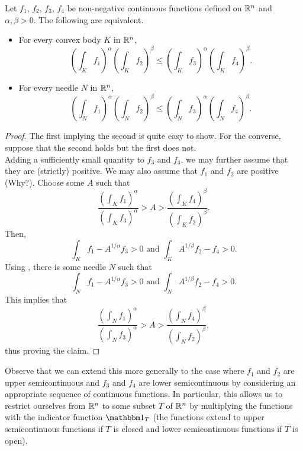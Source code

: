 		\begin{lemma}
			\label{lem: 5.1}
			Let $f_1$, $f_2$, $f_3$, $f_4$ be non-negative continuous functions defined on $\mathbb{R}^n$ and $\alpha,\beta>0$. The following are equivalent.
			\begin{itemize}
				\item For every convex body $K$ in $\mathbb{R}^n$,
					\[ \left(\int_K f_1\right)^\alpha \left(\int_K f_2\right)^\beta \leq \left(\int_K f_3\right)^\alpha \left(\int_K f_4\right)^\beta. \]
				\item For every needle $N$ in $\mathbb{R}^n$,
					\[ \left(\int_N f_1\right)^\alpha \left(\int_N f_2\right)^\beta \leq \left(\int_N f_3\right)^\alpha \left(\int_N f_4\right)^\beta. \]
			\end{itemize}
		\end{lemma}
		\begin{proof}
			The first implying the second is quite easy to show. For the converse, suppose that the second holds but the first does not.\\
			Adding a sufficiently small quantity to $f_3$ and $f_4$, we may further assume that they are (strictly) positive. We may also assume that $f_1$ and $f_2$ are positive (Why?). Choose some $A$ such that
			\[ \frac{\left(\int_K f_1\right)^\alpha}{\left(\int_K f_3\right)^\alpha} > A > \frac{\left(\int_K f_4\right)^\beta}{\left(\int_K f_2\right)^\beta}. \]
			Then,
			\[ \int_K f_1 - A^{1/\alpha}f_3 > 0 \text{ and } \int_K A^{1/\beta}f_2 - f_4 > 0. \]
			Using , there is some needle $N$ such that
			\[ \int_N f_1 - A^{1/\alpha}f_3 > 0 \text{ and } \int_N A^{1/\beta}f_2 - f_4 > 0. \]
			This implies that
			\[ \frac{\left(\int_N f_1\right)^\alpha}{\left(\int_N f_3\right)^\alpha} > A > \frac{\left(\int_N f_4\right)^\beta}{\left(\int_N f_2\right)^\beta}, \]
			thus proving the claim.
		\end{proof}

		Observe that we can extend this more generally to the case where $f_1$ and $f_2$ are upper semicontinuous and $f_3$ and $f_4$ are lower semicontinuous by considering an appropriate sequence of continuous functions. In particular, this allows us to restrict ourselves from $\mathbb{R}^n$ to some subset $T$ of $\mathbb{R}^n$ by multiplying the functions with the indicator function $\indic_T$ (the functions extend to upper semicontinuous functions if $T$ is closed and lower semicontinuous functions if $T$ is open).


